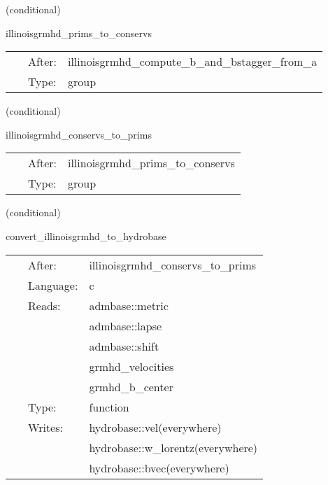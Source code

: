    (conditional) 

\hspace{5mm} illinoisgrmhd\_prims\_to\_conservs 

\hspace{5mm}{\it compute conservative variables from primitives } 


\hspace{5mm}

 \begin{tabular*}{160mm}{cll} 
~ & After:  & illinoisgrmhd\_compute\_b\_and\_bstagger\_from\_a \\ 
~ & Type:  & group \\ 
\end{tabular*} 


\vspace{5mm}

   (conditional) 

\hspace{5mm} illinoisgrmhd\_conservs\_to\_prims 

\hspace{5mm}{\it compute primitive variables from conservatives } 


\hspace{5mm}

 \begin{tabular*}{160mm}{cll} 
~ & After:  & illinoisgrmhd\_prims\_to\_conservs \\ 
~ & Type:  & group \\ 
\end{tabular*} 


\vspace{5mm}

   (conditional) 

\hspace{5mm} convert\_illinoisgrmhd\_to\_hydrobase 

\hspace{5mm}{\it convert illinoisgrmhd-native variables to hydrobase } 


\hspace{5mm}

 \begin{tabular*}{160mm}{cll} 
~ & After:  & illinoisgrmhd\_conservs\_to\_prims \\ 
~ & Language:  & c \\ 
~ & Reads:  & admbase::metric \\ 
~& ~ &admbase::lapse\\ 
~& ~ &admbase::shift\\ 
~& ~ &grmhd\_velocities\\ 
~& ~ &grmhd\_b\_center\\ 
~ & Type:  & function \\ 
~ & Writes:  & hydrobase::vel(everywhere) \\ 
~& ~ &hydrobase::w\_lorentz(everywhere)\\ 
~& ~ &hydrobase::bvec(everywhere)\\ 
\end{tabular*} 


